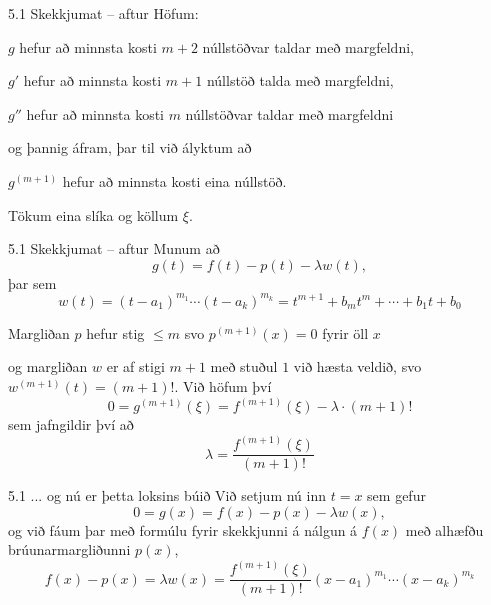 \begin{frame}{5.1 Skekkjumat -- aftur} 
 Höfum:

\smallskip
$g$ hefur  að minnsta kosti $m+2$ núllstöðvar taldar með margfeldni,

\pause
\smallskip
$g'$ hefur  að minnsta kosti $m+1$ núllstöð talda með margfeldni,


\pause
\smallskip
$g''$ hefur  að minnsta kosti $m$ núllstöðvar taldar með margfeldni 

\pause
\smallskip
og þannig áfram, þar til við ályktum að 


\pause
\smallskip
$g^{(m+1)}$ hefur  að minnsta kosti eina  núllstöð.  

\pause
\smallskip
Tökum eina slíka og köllum $\xi$.
\end{frame}

\begin{frame}{5.1 Skekkjumat -- aftur} 
Munum að 
\begin{equation*}
  g(t) = f(t) - p(t) - \lambda w(t),
\end{equation*}
þar sem
\begin{equation*}
  w(t) = (t-a_1)^{m_1} \cdots (t-a_k)^{m_k}=t^{m+1}+b_mt^m+\cdots+b_1t+b_0
\end{equation*}

\pause
\smallskip
Margliðan $p$ hefur stig $\leq m$ svo $p^{(m+1)}(x) = 0$  fyrir öll
$x$ 

\pause
og margliðan $w$ er af stigi $m+1$ með stuðul $1$ við hæsta veldið,
svo $w^{(m+1)}(t) = (m+1)!$. Við höfum því
\begin{equation*}
  0 = g^{(m+1)}(\xi) = f^{(m+1)}(\xi) - \lambda \cdot (m+1)!
\end{equation*}
sem jafngildir því að
$$
\lambda =\dfrac{f^{(m+1)}(\xi)}{(m+1)!}
$$
\end{frame}

\begin{frame}{5.1 ... og nú er þetta loksins búið} 
Við setjum nú inn $t=x$ sem gefur 
\begin{equation*}
0=g(x) = f(x) - p(x) - \lambda w(x),
\end{equation*}
og við fáum þar með formúlu fyrir skekkjunni á nálgun á $f(x)$
með alhæfðu brúunarmargliðunni $p(x)$, 
\begin{equation*}
f(x) - p(x) =\lambda w(x) = \dfrac{f^{(m+1)}(\xi)}{(m+1)!} 
(x-a_1)^{m_1} \cdots (x-a_k)^{m_k}
\end{equation*}
\end{frame}

